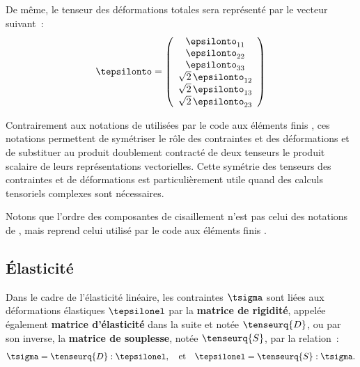 De même, le tenseur des déformations totales sera représenté par le
vecteur suivant~:
\begin{equation}
  \label{eq:tepsilonto}
  \tepsilonto = \left(
    \begin{array}{c}
      \epsilonto_{11} \\
      \epsilonto_{22}  \\
      \epsilonto_{33}  \\
      \sqrt{2}\,\epsilonto_{12} \\
      \sqrt{2}\,\epsilonto_{13} \\
      \sqrt{2}\,\epsilonto_{23} \\
    \end{array}
  \right)
\end{equation}

Contrairement aux notations de  utilisées par le code aux
éléments finis \castem{}, ces notations permettent de symétriser le
rôle des contraintes et des déformations et de substituer au produit
doublement contracté de deux tenseurs le produit scalaire de leurs
représentations vectorielles. Cette symétrie des tenseurs des
contraintes et de déformations est particulièrement utile quand des
calculs tensoriels complexes sont nécessaires.

Notons que l'ordre des composantes de cisaillement n'est pas celui des
notations de , mais reprend celui utilisé par le code aux
éléments finis \castem{}.

\subsection{Élasticité}
\label{sec:elasticite}

Dans le cadre de l'élasticité linéaire, les contraintes $\tsigma$ sont
liées aux déformations élastiques $\tepsilonel$ par la {\bf matrice de
  rigidité}, appelée également {\bf matrice d'élasticité} dans la
suite et notée $\tenseurq{D}$, ou par son inverse, la {\bf matrice de
  souplesse}, notée $\tenseurq{S}$, par la relation~:
\[
\tsigma=\tenseurq{D}:\tepsilonel
,\quad\text{et}\quad
\tepsilonel=\tenseurq{S}:\tsigma
.\]

